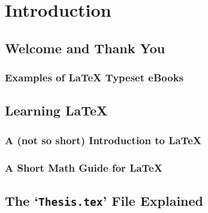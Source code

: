 
\chapter{Introduction} %
\label{Chapter1}

\section{Welcome and Thank You}

\subsection{Examples of \LaTeX{} Typeset eBooks}

\section{Learning \LaTeX{}}

\subsection{A (not so short) Introduction to \LaTeX{}}

\subsection{A Short Math Guide for \LaTeX{}}
\section{The `\texttt{Thesis.tex}' File Explained}


